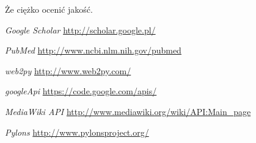 \documentclass[11pt,a4paper]{article}
\begin{document}
Że ciężko ocenić jakość.

\begin{thebibliography}{9}
  \emph{Google Scholar}
  \url{http://scholar.google.pl/}

  \emph{PubMed}
  \url{http://www.ncbi.nlm.nih.gov/pubmed}

  \emph{web2py}
  \url{http://www.web2py.com/}

  \emph{googleApi}
  \url{https://code.google.com/apis/}

  \emph{MediaWiki API}
  \url{http://www.mediawiki.org/wiki/API:Main_page}

  \emph{Pylons}
  \url{http://www.pylonsproject.org/}  
  

\end{thebibliography}
\end{document}
